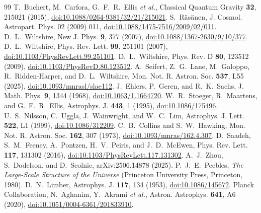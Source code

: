 \documentclass[aps,prd,reprint,amsmath,amssymb,superscriptaddress]{revtex4-2}
\begin{document}
\begin{thebibliography}{99}
 T.~Buchert, M.~Carfora, G.~F.~R.~Ellis \textit{et al.}, Classical Quantum Gravity \textbf{32}, 215021 (2015), \href{https://doi.org/10.1088/0264-9381/32/21/215021}{doi:10.1088/0264-9381/32/21/215021}.
 S.~R{\"a}s{\"a}nen, J. Cosmol. Astropart. Phys. 02 (2009) 011, \href{https://doi.org/10.1088/1475-7516/2009/02/011}{doi:10.1088/1475-7516/2009/02/011}.
 D.~L.~Wiltshire, New J. Phys. \textbf{9}, 377 (2007), \href{https://doi.org/10.1088/1367-2630/9/10/377}{doi:10.1088/1367-2630/9/10/377}.
 D.~L.~Wiltshire, Phys. Rev. Lett. \textbf{99}, 251101 (2007), \href{https://doi.org/10.1103/PhysRevLett.99.251101}{doi:10.1103/PhysRevLett.99.251101}.
 D.~L.~Wiltshire, Phys. Rev. D \textbf{80}, 123512 (2009), \href{https://doi.org/10.1103/PhysRevD.80.123512}{doi:10.1103/PhysRevD.80.123512}.
 A.~Seifert, Z.~G.~Lane, M.~Galoppo, R.~Ridden-Harper, and D.~L.~Wiltshire, Mon. Not. R. Astron. Soc. \textbf{537}, L55 (2025), \href{https://doi.org/10.1093/mnrasl/slae112}{doi:10.1093/mnrasl/slae112}.
 J.~Ehlers, P.~Geren, and R.~K.~Sachs, J. Math. Phys. \textbf{9}, 1344 (1968), \href{https://doi.org/10.1063/1.1664720}{doi:10.1063/1.1664720}.
 W.~R.~Stoeger, R.~Maartens, and G.~F.~R.~Ellis, Astrophys. J. \textbf{443}, 1 (1995), \href{https://doi.org/10.1086/175496}{doi:10.1086/175496}.
 U.~S.~Nilsson, C.~Uggla, J.~Wainwright, and W.~C.~Lim, Astrophys. J. Lett. \textbf{522}, L1 (1999), \href{https://doi.org/10.1086/312209}{doi:10.1086/312209}.
 C.~B.~Collins and S.~W.~Hawking, Mon. Not. R. Astron. Soc. \textbf{162}, 307 (1973), \href{https://doi.org/10.1093/mnras/162.4.307}{doi:10.1093/mnras/162.4.307}.
 D.~Saadeh, S.~M.~Feeney, A.~Pontzen, H.~V.~Peiris, and J.~D.~McEwen, Phys. Rev. Lett. \textbf{117}, 131302 (2016), \href{https://doi.org/10.1103/PhysRevLett.117.131302}{doi:10.1103/PhysRevLett.117.131302}.
 A.~J.~Zhou, S.~Dodelson, and D.~Scolnic, arXiv:2506.14878 (2025).
 P.~J.~E.~Peebles, \textit{The Large-Scale Structure of the Universe} (Princeton University Press, Princeton, 1980).
 D.~N.~Limber, Astrophys. J. \textbf{117}, 134 (1953), \href{https://doi.org/10.1086/145672}{doi:10.1086/145672}.
 Planck Collaboration, N.~Aghanim, Y.~Akrami \textit{et al.}, Astron. Astrophys. \textbf{641}, A6 (2020), \href{https://doi.org/10.1051/0004-6361/201833910}{doi:10.1051/0004-6361/201833910}.

\end{thebibliography}
\end{document}
